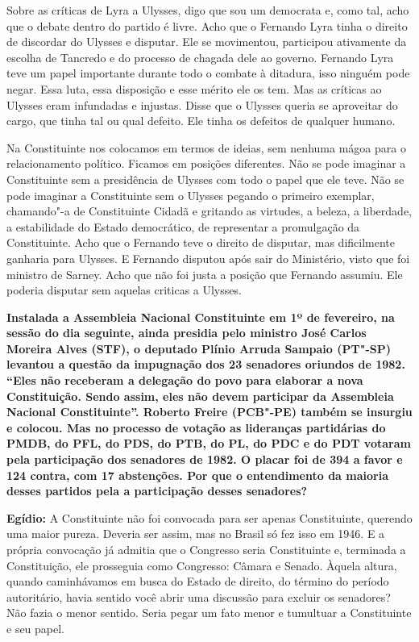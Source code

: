 Sobre as críticas de Lyra a Ulysses, digo que sou um democrata e, como
tal, acho que o debate dentro do partido é livre. Acho que o Fernando
Lyra tinha o direito de discordar do Ulysses e disputar. Ele se
movimentou, participou ativamente da escolha de Tancredo e do processo
de chagada dele ao governo. Fernando Lyra teve um papel importante
durante todo o combate à ditadura, isso ninguém pode negar. Essa luta,
essa disposição e esse mérito ele os tem. Mas as críticas ao Ulysses
eram infundadas e injustas. Disse que o Ulysses queria se aproveitar do
cargo, que tinha tal ou qual defeito. Ele tinha os defeitos de qualquer
humano.

Na Constituinte nos colocamos em termos de ideias, sem nenhuma mágoa
para o relacionamento político. Ficamos em posições diferentes. Não se
pode imaginar a Constituinte sem a presidência de Ulysses com todo o
papel que ele teve. Não se pode imaginar a Constituinte sem o Ulysses
pegando o primeiro exemplar, chamando"-a de Constituinte Cidadã e
gritando as virtudes, a beleza, a liberdade, a estabilidade do Estado
democrático, de representar a promulgação da Constituinte. Acho que o
Fernando teve o direito de disputar, mas dificilmente ganharia para
Ulysses. E Fernando disputou após sair do Ministério, visto que foi
ministro de Sarney. Acho que não foi justa a posição que Fernando
assumiu. Ele poderia disputar sem aquelas criticas a Ulysses.

\textbf{Instalada a Assembleia Nacional Constituinte em 1º de fevereiro,
na sessão do dia seguinte, ainda presidia pelo ministro José Carlos
Moreira Alves (STF), o deputado Plínio Arruda Sampaio (PT"-SP) levantou a
questão da impugnação dos 23 senadores oriundos de 1982. ``Eles não
receberam a delegação do povo para elaborar a nova Constituição. Sendo
assim, eles não devem participar da Assembleia Nacional Constituinte''.
Roberto Freire (PCB"-PE) também se insurgiu e colocou. Mas no processo de
votação as lideranças partidárias do PMDB, do PFL, do PDS, do PTB, do
PL, do PDC e do PDT votaram pela participação dos senadores de 1982. O
placar foi de 394 a favor e 124 contra, com 17 abstenções. Por que o
entendimento da maioria desses partidos pela a participação desses
senadores?}

\textbf{Egídio:} A Constituinte não foi convocada para ser apenas
Constituinte, querendo uma maior pureza. Deveria ser assim, mas no
Brasil só fez isso em 1946. E a própria convocação já admitia que o
Congresso seria Constituinte e, terminada a Constituição, ele prosseguia
como Congresso: Câmara e Senado. Àquela altura, quando caminhávamos em
busca do Estado de direito, do término do período autoritário, havia
sentido você abrir uma discussão para excluir os senadores? Não fazia o
menor sentido. Seria pegar um fato menor e tumultuar a Constituinte e
seu papel.

